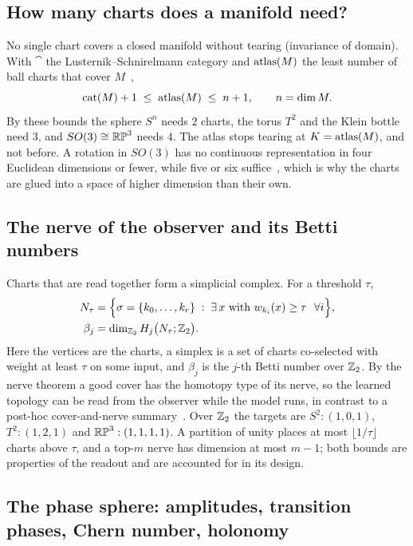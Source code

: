 \subsection{How many charts does a manifold need?}

No single chart covers a closed manifold without tearing (invariance of domain). With $\cat$ the Lusternik--Schnirelmann category and $\operatorname{atlas}(M)$ the least number of ball charts that cover $M$~\cite{rudyak2006atlas},
\begin{equation}\label{eq:atlasbound}
  \operatorname{cat}(M)+1\;\le\;\operatorname{atlas}(M)\;\le\;n+1,\qquad n=\dim M.
\end{equation}
By these bounds the sphere $S^n$ needs $2$ charts, the torus $T^2$ and the Klein bottle need $3$, and $SO(3)\cong\mathbb{RP}^3$ needs $4$. The atlas stops tearing at $K=\operatorname{atlas}(M)$, and not before. A rotation in $SO(3)$ has no continuous representation in four Euclidean dimensions or fewer, while five or six suffice~\cite{zhou2019rotation}, which is why the charts are glued into a space of higher dimension than their own.

\subsection{The nerve of the observer and its Betti numbers}

Charts that are read together form a simplicial complex. For a threshold $\tau$,
\begin{align}
  N_\tau&=\Big\{\sigma=\{k_0,\dots,k_r\}\;:\;\exists\,x\ \text{with}\ w_{k_i}(x)\ge\tau\ \ \forall i\Big\}, \label{eq:nerve}\\
  \beta_j&=\dim_{\Zt}H_j\big(N_\tau;\Zt\big). \label{eq:betti}
\end{align}
Here the vertices are the charts, a simplex is a set of charts co-selected with weight at least $\tau$ on some input, and $\beta_j$ is the $j$-th Betti number over $\mathbb{Z}_2$. By the nerve theorem a good cover has the homotopy type of its nerve, so the learned topology can be read from the observer while the model runs, in contrast to a post-hoc cover-and-nerve summary~\cite{singh2007mapper}. Over $\mathbb{Z}_2$ the targets are $S^2:(1,0,1)$, $T^2:(1,2,1)$ and $\mathbb{RP}^3:(1,1,1,1)$. A partition of unity places at most $\lfloor 1/\tau\rfloor$ charts above $\tau$, and a top-$m$ nerve has dimension at most $m-1$; both bounds are properties of the readout and are accounted for in its design.

\subsection{The phase sphere: amplitudes, transition phases, Chern number, holonomy}

